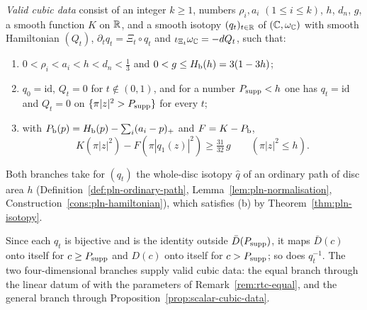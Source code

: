 \begin{definition}\label{def:shd4-data}
\emph{Valid cubic data} consist of an integer $k\ge1$, numbers $\rho_i,a_i$ $(1\le i\le k)$, $h$, $d_n$, $g$, a smooth
function $K$ on $\mathbb{R}$, and a smooth isotopy $(q_t)_{t\in\mathbb{R}}$ of $(\mathbb{C},\omega_{\mathbb{C}})$ with smooth Hamiltonian $(Q_t)$,
$\partial_tq_t=\Xi_t\circ q_t$ and $\iota_{\Xi_t}\omega_{\mathbb{C}}=-dQ_t$, such that:
\begin{enumerate}[label=(\alph*)]
\item $0<\rho_i<a_i<h<d_n<\frac13$ and $0<g\le H_{\mathrm b}(h)=3(1-3h)$;
\item $q_0=\mathrm{id}$, $Q_t=0$ for $t\notin(0,1)$, and for a number $P_{\rm supp}<h$ one has $q_t=\mathrm{id}$ and $Q_t=0$
on $\{\pi|z|^2>P_{\rm supp}\}$ for every $t$;
\item with $P_{\mathrm b}(p)=H_{\mathrm b}(p)-\sum_i(a_i-p)_+$ and $F=K-P_{\mathrm b}$,
\begin{equation}\label{eq:shd4-comparison}
 K(\pi|z|^2)-F(\pi|q_1(z)|^2)\ge\tfrac{31}{32}\,g\qquad(\pi|z|^2\le h).
\end{equation}
\end{enumerate}
\end{definition}

Both branches take for $(q_t)$ the whole-disc isotopy $\hat q$ of an ordinary path of disc area $h$
(Definition~\ref{def:pln-ordinary-path}, Lemma~\ref{lem:pln-normalisation}, Construction~\ref{cons:pln-hamiltonian}), which
satisfies (b) by Theorem~\ref{thm:pln-isotopy}.

Since each $q_t$ is bijective and is the identity outside $\bar D(P_{\rm supp})$, it maps $\bar D(c)$ onto itself for
$c\ge P_{\rm supp}$ and $D(c)$ onto itself for $c>P_{\rm supp}$; so does $q_t^{-1}$. The two four-dimensional
branches supply valid cubic data: the equal branch through the linear datum of 
with the parameters of Remark~\ref{rem:rtc-equal}, and the general branch through
Proposition~\ref{prop:scalar-cubic-data}.

